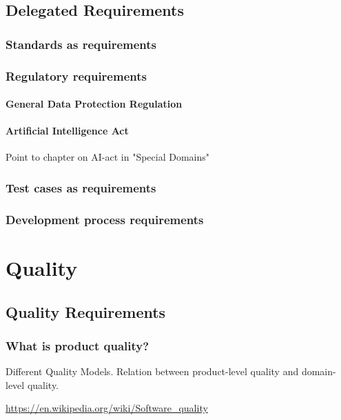 \documentclass{reqengbook}
\begin{document}
\chapter{Delegated Requirements}

\section{Standards as requirements}

\section{Regulatory requirements}

\subsection{General Data Protection Regulation} 

\subsection{Artificial Intelligence Act}
Point to chapter on AI-act in "Special Domains"

\section{Test cases as requirements}

\section{Development process requirements}


\part{Quality} %


\chapter{Quality Requirements}
\section{What is product quality?}
Different Quality Models. Relation between product-level quality and domain-level quality.

\url{https://en.wikipedia.org/wiki/Software_quality}
\end{document}
